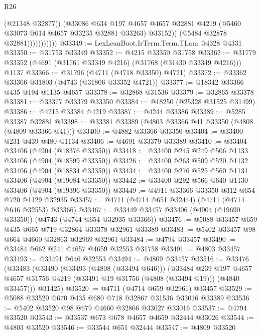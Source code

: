 \begin{lexlean}{R26}
\begin{coremodule}
                            (@21348 @32877))
                          (@33086
                            @634
                            @197
                            @4657
                            @4657
                            @32881
                            @4219
                            (@5460 @33073 @614 @4657 @33235 @32881 @33263)
                            @33152))
                        (@5484 @32878 @32881)))))))))))
@33349 := LexLeanBoot.IrTerm.Term.TLam @4328 @4331
@33350 := @31753 @33349
@33352 := @4215 @33350 @31758
@33362 := @31779 @33352 (@4691 (@31761 @33349 @4216) (@31768 (@31430 @33349 @4216))) @1137
@33366 := @31796 (@4711 (@4718 @33350) @4721)
@33372 := @33362 @33366 @31803 (@4743 (@31806 @33352 @4721))
@33377 := @18342 @33366 @435 @194 @1135 @4657
@33378 := @32868 @31536
@33379 := @32865 @33378
@33381 := @33377 @33379 @33350
@33384 := @18250 (@25328 @31525 @31499)
@33386 := @4215 @33384 @4219
@33387 := @4244 @33386
@33389 := @5285 @33387 @32881
@33398 := @33381 @33389 (@4803 @33366 @41 @33350 (@4808 (@4809 @33366 @41)))
@33400 := @4882 @33366 @33350
@33404 := @33400 @231 @439 @480 @1134
@33406 := @4691 @33379 @33389
@33410 := @33404 @33406 (@4904 (@18376 @33350))
@33418 := @33400 @245 @249 @506 @1133 @33406 (@4904 (@18599 @33350))
@33426 := @33400 @263 @509 @520 @1132 @33406 (@4904 (@18834 @33350))
@33434 := @33400 @276 @525 @560 @1131 @33406 (@4904 (@19084 @33350))
@33442 := @33400 @292 @566 @640 @1130 @33406 (@4904 (@19396 @33350))
@33449 := @4911 @33366 @33350 @312 @654 @720 @1129 @32935
@33457 := @4711 (@4714 @651 @32444) (@4711 (@4714 @646 @32553) @33366)
@33467 := @33449 @33457 @33406 (@4904 (@19690 @33350)) (@4743 (@4744 @654 @32935 @33366))
@33476 := @5088 @33457 @659 @435 @665 @719 @32864 @33378 @32961 @33389
@33483 := @5402 @33457 @98 @664 @4660 @32863 @32969 @32961
@33484 := @4794 @33457
@33490 := @33484 @662 @241 @4657 @4659 @32553 @31758
@33491 := @4803 @33457
@33493 := @33491 @646 @32553
@33494 := @4809 @33457
@33516 := @33476
    (@33483
      (@33490
        (@33493 (@4808 (@33494 @646)))
        (@33484
          @239
          @197
          @4657
          @4657
          @31756
          @4219
          (@33491 @19 @31756 (@4808 (@33494 @19)))
          (@4840 @33457)))
      @31425)
@33520 := @4711 (@4714 @659 @32961) @33457
@33529 := @5088 @33520 @670 @435 @680 @718 @32867 @31536 @33016 @33389
@33536 := @5402 @33520 @98 @679 @4660 @32866 @33027 @33016
@33537 := @4794 @33520
@33543 := @33537 @673 @678 @4657 @4659 @32444 @33026
@33544 := @4803 @33520
@33546 := @33544 @651 @32444
@33547 := @4809 @33520

\end{coremodule}
\end{lexlean}
